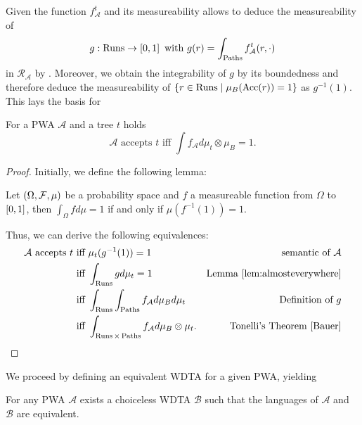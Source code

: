 Given the function $f_{\mathcal{A}}^{t}$ and its measureability allows to
deduce the measureability of
\begin{equation*}
  g:\operatorname{Runs}\rightarrow\left[0,1\right]\text{ with } 
    g(r) = \int_{\operatorname{Paths}}f_{\mathcal{A}}^{t}(r, \cdot)
\end{equation*}
in $\mathcal{R}_{\mathcal{A}}$ by \cite[Lemma 23.1]{Bauer}. Moreover, we obtain
the integrability of $g$ by its boundedness and therefore deduce the 
measureability of $\left\{r\in\operatorname{Runs}\mid\mu_{B}(\operatorname{Acc}(r)) = 1 \right\}$ as 
$g^{-1}(1)$. This lays the basis for 
\begin{proposition}
  \cite[Proposition 42]{RandAutoInfTrees}
  For a \ac{PWA} $\mathcal{A}$ and a tree $t$ holds
  \begin{equation*}
    \mathcal{A}\text{ accepts }t
    \text{ iff }
    \int f_{\mathcal{A}} d\mu_{t}\otimes\mu_{B} = 1.
  \end{equation*}
  \label{prop:pwabyf}
\end{proposition}
\begin{proof}
  Initially, we define the following lemma:
  \begin{lemma}
    \cite[Lemma 40]{RandAutoInfTrees} Let $\left(\Omega,\mathcal{F},\mu\right)$ be
    a probability space and $f$ a measureable function from $\Omega$ to
    $\left[0,1\right]$, then $\int_{\Omega}f d\mu = 1$ if and only if 
    $\mu(f^{-1}(1)) = 1$.
    \label{lem:almosteverywhere}
  \end{lemma}
  Thus, we can derive the following equivalences:
  \begin{align*}
    \mathcal{A}\text{ accepts }t
     &\text{ iff }\mu_{t}(g^{-1}(1)) = 1&\text{semantic of }\mathcal{A}\\
    &\text{ iff }\int_{\Runs} g d\mu_{t} = 1
     &\text{Lemma \ref{lem:almosteverywhere}}\\
    &\text{ iff }\int_{\Runs}\int_{\Paths} f_{\mathcal{A}} d\mu_{B} d\mu_{t}
     &\text{Definition of }g\\
    &\text{ iff }\int_{\Runs\times\Paths}f_{\mathcal{A}}d\mu_{B}\otimes\mu_{t}.
     &\text{Tonelli's Theorem \cite[Theorem 23.6]{Bauer}}
  \end{align*}
\end{proof}
We proceed by defining an equivalent \ac{WDTA} for a given \ac{PWA}, yielding
\begin{theorem}
  For any \ac{PWA} $\mathcal{A}$ exists a choiceless \ac{WDTA} $\mathcal{B}$
  such that the languages of $\mathcal{A}$ and $\mathcal{B}$ are equivalent.
\end{theorem}
